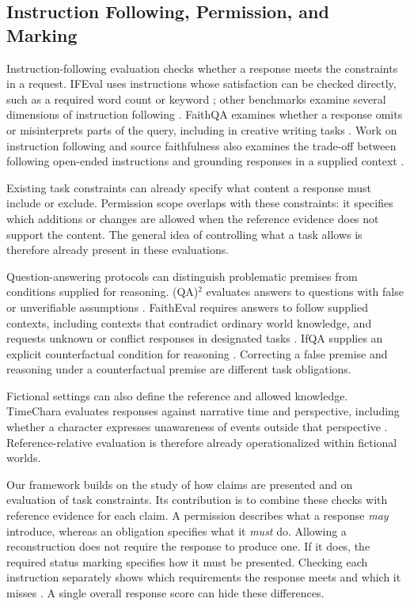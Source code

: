 \documentclass{clv2025}
\begin{document}
\subsection{Instruction Following, Permission, and Marking}

Instruction-following evaluation checks whether a response meets the
constraints in a request. IFEval uses instructions whose satisfaction can
be checked directly, such as a required word count or keyword
\citep{zhou_ifeval_2023}; other benchmarks examine several dimensions of
instruction following \citep{ye_muldimif_2025}. FaithQA examines whether a
response omits or misinterprets parts of the query, including in creative
writing tasks \citep{hao_faithqa_2025}.
Work on instruction following and source faithfulness also examines the
trade-off between following open-ended instructions and grounding responses
in a supplied context \citep{wu_dancing_2024}.

Existing task constraints can already specify what content a response
must include or exclude. Permission scope overlaps with these constraints:
it specifies which additions or changes are allowed when the reference
evidence does not support the content. The general idea of controlling
what a task allows is therefore already present in these evaluations.

Question-answering protocols can distinguish problematic premises from
conditions supplied for reasoning. (QA)$^2$ evaluates answers to questions
with false or unverifiable assumptions \citep{kim_qa2_2023}.
FaithEval requires answers to follow supplied contexts, including contexts
that contradict ordinary world knowledge, and requests unknown or conflict
responses in designated tasks \citep{ming_faitheval_2025}.
IfQA supplies an explicit counterfactual condition for reasoning
\citep{yu_ifqa_2023}. Correcting a false premise and reasoning under a
counterfactual premise are different task obligations.

Fictional settings can also define the reference and allowed knowledge.
TimeChara evaluates responses against narrative time and perspective,
including whether a character expresses unawareness of events outside
that perspective \citep{ahn_timechara_2024}. Reference-relative evaluation
is therefore already operationalized within fictional worlds.

Our framework builds on the study of how claims are presented and on
evaluation of task constraints. Its contribution is to combine these
checks with reference evidence for each claim. 
A permission describes what a response \emph{may} introduce, whereas an
obligation specifies what it \emph{must} do. Allowing a reconstruction does
not require the response to produce one. If it does, the required status
marking specifies how it must be presented. Checking each instruction
separately shows which requirements the response meets and which it
misses \citep{lee_mcjudgebench_2026}. A single overall response score can
hide these differences.
\end{document}
